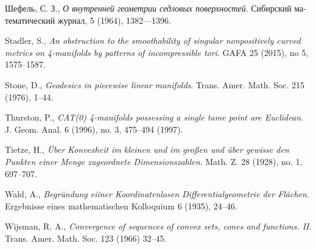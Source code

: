 \begin{thebibliography}{52}
\begin{otherlanguage}{russian}
Шефель, С. З., 
\textit{О внутренней геометрии седловых поверхностей}.
Сибирский математический журнал, 5 (1964), 1382---1396.
\end{otherlanguage}

Stadler, S.,
\textit{An obstruction to the smoothability of singular nonpositively curved metrics on 4-manifolds by patterns of incompressible tori}.
GAFA
25 (2015), 
no 5, 
1575--1587.

Stone, D.,
\textit{Geodesics in piecewise linear manifolds}.
Trans. Amer. Math. Soc. 
215 
(1976), 
1--44.

 Thurston, P.,
\textit{CAT(0) 4-manifolds possessing a single tame point are Euclidean}. 
J. Geom. Anal. 
6 (1996), 
no. 3, 
475--494 (1997). 

 Tietze, H.,
\emph{\"Uber Konvexheit im kleinen und im gro\ss{}en und \"uber gewisse den Punkten einer Menge zugeordnete Dimensionszahlen}.
Math. Z. 28 (1928), no. 1, 697--707. 

 Wald, A., \textit{Begr\"undung eiiner Koordinatenlosen Differentialgeometrie der Fl\"achen}.
Ergebnisse eines mathematischen Kolloquium
6  (1935), 24--46.

 Wijsman, R. A., 
\textit{Convergence of sequences of convex sets, cones and functions. II}. 
Trans. Amer. Math. Soc. 
123 (1966) 32--45.


\end{thebibliography}
